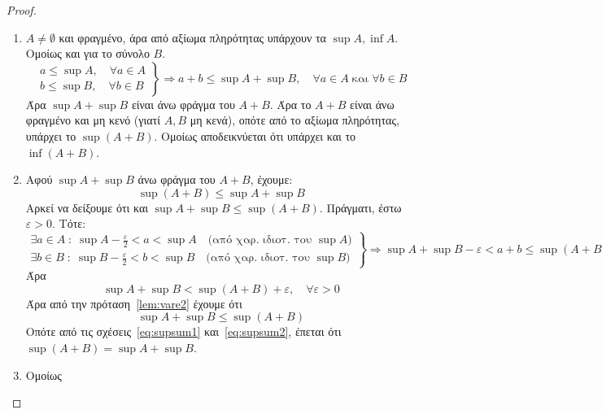 \begin{proof}
\item {}
  \begin{enumerate}
    \item $ A \neq \emptyset $ και φραγμένο, άρα από αξίωμα πληρότητας υπάρχουν τα 
      $ \sup A, \inf A $. Ομοίως και για το σύνολο $B$.
      \[
        \left.
          \begin{aligned}
            a \leq \sup A, \quad \forall a \in A \\
            b \leq \sup B, \quad \forall b \in B 
          \end{aligned}
        \right\} \Rightarrow a+b \leq \sup A + \sup B, \quad \forall a \in A 
        \; \text{και} \; \forall b \in B
      \]
      Άρα $ \sup A + \sup B $ είναι άνω φράγμα του $ A+B $. Άρα το $ A+B $ είναι 
      άνω φραγμένο και μη κενό (γιατί $A,B$ μη κενά), οπότε από το αξίωμα πληρότητας, 
      υπάρχει το $ \sup {(A+B)} $. Ομοίως αποδεικνύεται ότι υπάρχει και το 
      $ \inf {(A+B)} $. 
    \item Αφού $ \sup A + \sup B $ άνω φράγμα του $ A+B $, έχουμε:
      \begin{equation}\label{eq:supsum1}
        \sup {(A+B)} \leq \sup A + \sup B 
      \end{equation} 
      Αρκεί να δείξουμε ότι και $ \sup A + \sup B \leq \sup {(A+B)} $. Πράγματι, έστω 
      $ \varepsilon > 0 $. Τότε:
      \[
        \left.
          \begin{aligned} 
            \exists a \in A \; : \; \sup A - \frac{\varepsilon}{2} < a < \sup A 
            \quad \text{(από χαρ. ιδιοτ.\ του $\sup A$)} \\
            \exists b \in B \; : \; \sup B - \frac{\varepsilon}{2} < b < \sup B 
            \quad \text{(από χαρ. ιδιοτ.\ του $\sup B$)} 
          \end{aligned} 
        \right\} \Rightarrow \sup A + \sup B - \varepsilon < a+b \leq \sup {(A+B)} 
      \] 
      Άρα 
      \[
        \sup A + \sup B < \sup {(A+B)} + \varepsilon , \quad \forall \varepsilon >0
      \] 
      Άρα από την πρόταση~\ref{lem:vare2} έχουμε ότι 
      \begin{equation}\label{eq:supsum2}
        \sup A + \sup B \leq \sup {(A+B)}
      \end{equation}
      Οπότε από τις σχέσεις~\eqref{eq:supsum1} και~\eqref{eq:supsum2}, έπεται ότι 
      $ \sup {(A+B)} = \sup A + \sup B $. 
    \item Ομοίως
  \end{enumerate}
\end{proof}

